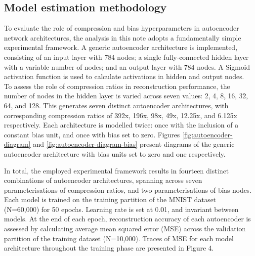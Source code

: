 \subsection{Model estimation methodology}\label{sec:estimation}

To evaluate the role of compression and bias hyperparameters in autoencoder network architectures, the analysis in this note adopts a fundamentally simple experimental framework.
A generic autoencoder architecture is implemented, consisting of an input layer with 784 nodes; a single fully-connected hidden layer with a variable number of nodes; and an output layer with 784 nodes.
A Sigmoid activation function is used to calculate activations in hidden and output nodes. 
To assess the role of compression ratios in reconstruction performance, the number of nodes in the hidden layer is varied across seven values: 2, 4, 8, 16, 32, 64, and 128.
This generates seven distinct autoencoder architectures, with corresponding compression ratios of 392x, 196x, 98x, 49x, 12.25x, and 6.125x respectively.
Each architecture is modelled twice: once with the inclusion of a constant bias unit, and once with bias set to zero.
Figures \ref{fig:autoencoder-diagram} and \ref{fig:autoencoder-diagram-bias} present diagrams of the generic autoencoder architecture with bias units set to zero and one respectively.

In total, the employed experimental framework results in fourteen distinct combinations of autoencoder architectures, spanning across seven parameterisations of compression ratios, and two parameterisations of bias nodes. 
Each model is trained on the training partition of the MNIST dataset (N=60,000) for 50 epochs.
Learning rate is set at 0.01, and invariant between models.
At the end of each epoch, reconstruction accuracy of each autoencoder is assessed by calculating average mean squared error (MSE) across the validation partition of the training dataset (N=10,000).
Traces of MSE for each model architecture throughout the training phase are presented in Figure 4.


